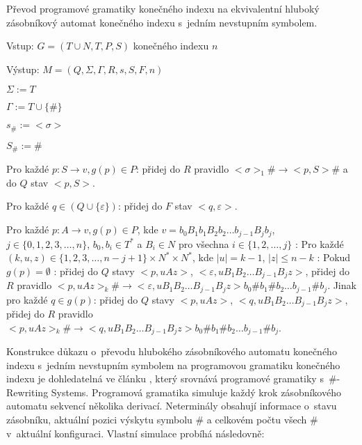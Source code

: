 \begin{Alg} \label{alg_PG}
Převod programové gramatiky konečného indexu na ekvivalentní hluboký zásobníkový automat konečného indexu s~jedním nevstupním symbolem.

\begin{list}{}{\setlength\parsep{0cm} \setlength\itemsep{0cm} \setlength\leftmargin{1em}}
  \item Vstup: $G = (T \cup N ,T,P,S)$ konečného indexu $n$
  \item Výstup: $M = (Q,\Sigma,\Gamma, R, s, S , F, n)$ \medskip
  
  \item ${\Sigma} := T$
  \item ${\Gamma} := T \cup \{\#\}$
  \item $s_\# := <\sigma>$
  \item $S_\# := \# $ \medskip

  \item Pro každé $p: S \rightarrow v, g(p) \in P$: 
  \subitem přidej do $R$ pravidlo $<\sigma>_1 \# \rightarrow <p, S> \#$ a do $Q$ stav $<p, S>$. \medskip

  \item Pro každé $q \in (Q \cup \{\varepsilon\})$: 
  \subitem přidej do $F$ stav $<q, \varepsilon>$. \medskip

  \item Pro každé $p: A \rightarrow v, g(p) \in P$,  kde $v=b_0 B_1 b_1 B_2 b_2 \dots b_{j-1} B_{j} b_j$, $j \in \{0,1,2,3,\dots,n\}$, $b_0,b_i \in T^*$ a $B_i \in N$ pro všechna $i \in \{1,2,\dots,j\}$ : \medskip
  \subitem Pro každé $(k,u,z) \in \{1,2,3,\dots,n-j+1\} \times N^* \times N^*$, kde $|u| = k-1$, $|z|  \le n-k$ : \medskip
  \subsubitem Pokud $g(p) = \emptyset$ :
  \subsubitem přidej do $Q$ stavy $<p,uAz>$, $<\varepsilon, u B_1 B_2 \dots B_{j-1} B_{j} z>$,
  \subsubitem přidej do $R$ pravidlo $<p,uAz>_k \# \rightarrow <\varepsilon, u B_1 B_2 \dots B_{j-1} B_{j} z> b_0 \# b_1 \# b_2 \dots b_{j-1} \# b_j$.\medskip
  \subsubitem Jinak pro každé $q \in g(p)$:
  \subsubitem přidej do $Q$ stavy $<p,uAz>$, $<q, u B_1 B_2 \dots B_{j-1} B_{j} z>$,
  \subsubitem přidej do $R$ pravidlo $<p,uAz>_k \# \rightarrow <q, u B_1 B_2 \dots B_{j-1} B_{j} z> b_0 \# b_1 \# b_2 \dots b_{j-1} \# b_j$.

\end{list}
\end{Alg}

Konstrukce důkazu o~převodu hlubokého zásobníkového automatu konečného indexu s~jedním nevstupním symbolem na programovou gramatiku konečného indexu je dohledatelná ve článku \cite{Krivka:RewritingSystems}, který srovnává programové gramatiky s~\#-Rewriting Systems. Programová gramatika simuluje každý krok zásobníkového automatu sekvencí několika derivací. Neterminály obsahují informace o~stavu zásobníku, aktuální pozici výskytu symbolu \# a celkovém počtu všech \# v~aktuální konfiguraci. Vlastní simulace probíhá následovně:

